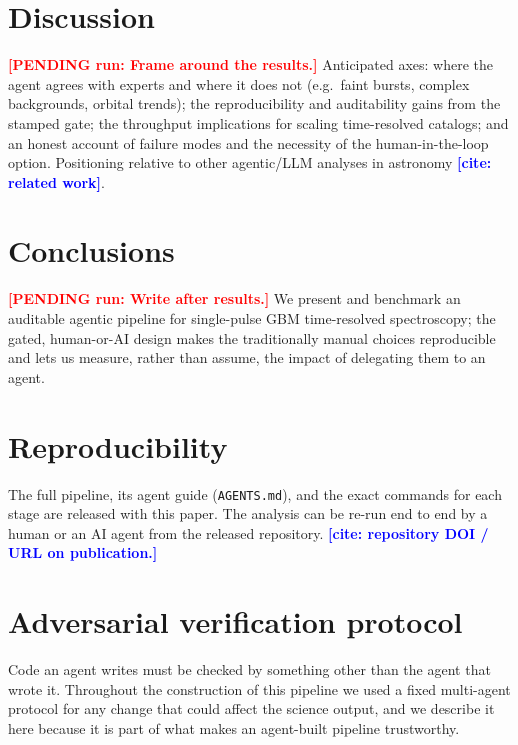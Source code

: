 \documentclass[twocolumn]{aastex631}
\newcommand{\PENDING}[1]{\textbf{\textcolor{red}{[PENDING run: #1]}}}
\newcommand{\TODOcite}[1]{\textbf{\textcolor{blue}{[cite: #1]}}}
\begin{document}
\section{Discussion} \label{sec:discussion}
\PENDING{Frame around the results.} Anticipated axes: where the agent agrees with
experts and where it does not (e.g.\ faint bursts, complex backgrounds, orbital
trends); the reproducibility and auditability gains from the stamped gate; the
throughput implications for scaling time-resolved catalogs; and an honest account
of failure modes and the necessity of the human-in-the-loop option. Positioning
relative to other agentic/LLM analyses in astronomy \TODOcite{related work}.

\section{Conclusions} \label{sec:conclusions}
\PENDING{Write after results.} We present and benchmark an auditable agentic
pipeline for single-pulse GBM time-resolved spectroscopy; the gated, human-or-AI
design makes the traditionally manual choices reproducible and lets us measure,
rather than assume, the impact of delegating them to an agent.

\appendix
\section{Reproducibility} \label{app:repro}
The full pipeline, its agent guide (\texttt{AGENTS.md}), and the exact commands for
each stage are released with this paper. The analysis can be re-run end to end by a
human or an AI agent from the released repository. \TODOcite{repository DOI / URL on
publication.}

\section{Adversarial verification protocol} \label{app:verify}
Code an agent writes must be checked by something other than the agent that wrote
it. Throughout the construction of this pipeline we used a fixed multi-agent
protocol for any change that could affect the science output, and we describe it
here because it is part of what makes an agent-built pipeline trustworthy.
\end{document}
